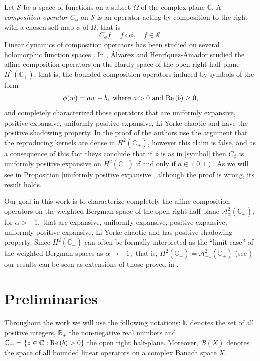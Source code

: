 \documentclass[11pt]{amsart}%
\numberwithin{equation}{section}
\theoremstyle{plain}
\theoremstyle{definition}
\theoremstyle{definition}
\newcommand{\re}{{\rm Re}\,}
\newcommand{\hb}{\mathbb{C}_+}
\newcommand{\Ber}{\mathcal{A}^2_{\alpha}(\hb)}
\begin{document}
Let $\mathcal{S}$ be a space of functions on a subset $\Omega$ of the complex plane $\mathbb{C}.$ A \emph{composition operator} $C_\phi$ on $\mathcal{S}$ is an operator acting by composition to the right with a chosen self-map $\phi$ of $\Omega$, that is
\[C_{\phi}f = f \circ \phi, \quad f \in \mathcal{S}.\]
Linear dynamics of composition operators has been studied on several holomorphic function spaces \cite{Bayart, Darji, Bourdon,Chalendar, Gallardo}. In \cite{Carlos}, Álvarez and Henríquez-Amador studied the affine composition operators on the Hardy space of the open right half-plane $H^2(\hb)$, that is, the bounded composition operators induced by symbols of the form 
\begin{align}\label{symbol}
\phi(w)=aw+b, \text{ where } a > 0 \text{ and } \re(b) \geq 0,
\end{align}
and completely characterized those operators that are uniformly expansive, positive expansive, uniformly positive expansive, Li-Yorke chaotic and have the positive shadowing property. In the proof of  \cite[Theorem 7]{Carlos} the authors use the argument that the reproducing kernels are dense in $H^2(\hb)$, however this claim is false, and as a consequence of this fact theys conclude that if $\phi$ is as in \eqref{symbol} then $C_{\phi}$ is uniformly positive expansive on $H^2(\hb)$ if and only if $a\in (0,1).$ As we will see in Proposition \ref{uniformly positive expansive}, although the proof \cite[Theorem 7]{Carlos} is wrong, its result holds. 


Our goal in this work is  to characterize completely the affine composition operators  on the weighted Bergman space of the open right half-plane $\Ber,$ for $\alpha>-1,$ that are expansive, uniformly expansive, positive expansive, uniformly positive expansive, Li-Yorke chaotic and has positive shadowing property. Since $H^2(\hb)$ can often be formally interpreted as the ``limit case'' of the weighted Bergman spaces as $\alpha\rightarrow -1,$ that is, $H^2(\hb)=\mathcal{A}_{-1}^2(\hb)$ (see \cite[page 819]{Riikka}) our results can be seen as extensions of those proved in \cite{Carlos}.


\section{Preliminaries}\label{s1}
Throughout the work we will use the following notations: $\mathbb{N}$ denotes the set of all positive integers, $\mathbb{R}_+$ the non-negative real numbers and $\hb=\{z\in \mathbb{C}:\re(b)>0\}$ the open right half-plane. Moreover, $\mathcal{B}(X)$ denotes the space of all bounded linear operators on a complex Banach space $X.$
\end{document}
